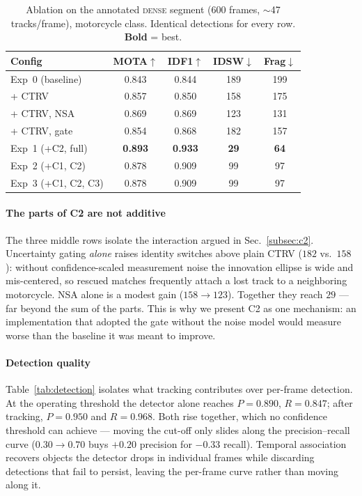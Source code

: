 \begin{table}[h]
  \centering
  \caption{Ablation on the annotated \textsc{dense} segment (600 frames,
           $\sim$47 tracks/frame), motorcycle class. Identical
           detections for every row. \textbf{Bold} = best.}
  \label{tab:ablation_results}
  \begin{tabular}{lcccc}
    \toprule
    Config & MOTA$\uparrow$ & IDF1$\uparrow$ & IDSW$\downarrow$
           & Frag$\downarrow$ \\
    \midrule
    Exp~0 (baseline)          & 0.843 & 0.844 & 189 & 199 \\
    \quad + CTRV              & 0.857 & 0.850 & 158 & 175 \\
    \quad + CTRV, NSA         & 0.869 & 0.869 & 123 & 131 \\
    \quad + CTRV, gate        & 0.854 & 0.868 & 182 & 157 \\
    Exp~1 (+C2, full)         & \textbf{0.893} & \textbf{0.933}
                              & \textbf{29} & \textbf{64} \\
    Exp~2 (+C1, C2)           & 0.878 & 0.909 & 99 & 97 \\
    Exp~3 (+C1, C2, C3)       & 0.878 & 0.909 & 99 & 97 \\
    \bottomrule
  \end{tabular}
\end{table}

\paragraph{The parts of C2 are not additive}
The three middle rows isolate the interaction argued in
Sec.~\ref{subsec:c2}.
Uncertainty gating \emph{alone} raises identity switches above plain
CTRV ($182$ vs.\ $158$): without confidence-scaled measurement noise the
innovation ellipse is wide and mis-centered, so rescued matches
frequently attach a lost track to a neighboring motorcycle.
NSA alone is a modest gain ($158 \rightarrow 123$).
Together they reach $29$ --- far beyond the sum of the parts.
This is why we present C2 as one mechanism: an implementation that
adopted the gate without the noise model would measure worse than the
baseline it was meant to improve.

\paragraph{Detection quality}
Table~\ref{tab:detection} isolates what tracking contributes over
per-frame detection.
At the operating threshold the detector alone reaches
$P{=}0.890$, $R{=}0.847$; after tracking, $P{=}0.950$ and $R{=}0.968$.
Both rise together, which no confidence threshold can achieve --- moving
the cut-off only slides along the precision--recall curve
($0.30 \rightarrow 0.70$ buys $+0.20$ precision for $-0.33$ recall).
Temporal association recovers objects the detector drops in individual
frames while discarding detections that fail to persist, leaving the
per-frame curve rather than moving along it.

